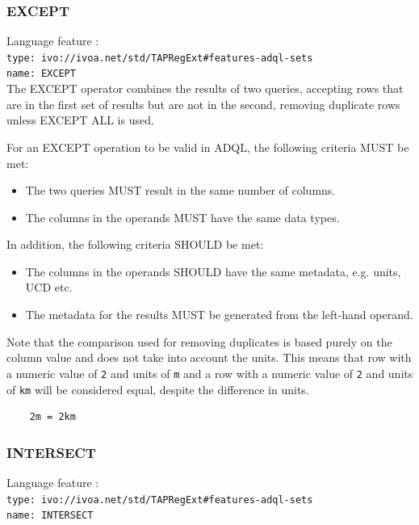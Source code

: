 \documentclass[11pt,a4paper]{ivoa}
\begin{document}
\subsubsection{EXCEPT}
{\footnotesize Language feature :}\\
{\footnotesize \verb|type: ivo://ivoa.net/std/TAPRegExt#features-adql-sets|}\\
{\footnotesize \verb|name: EXCEPT|}\\

The EXCEPT operator combines the results of two queries, accepting rows that are
in the first set of results but are not in the second,
removing duplicate rows unless EXCEPT ALL is used.

For an EXCEPT operation to be valid in ADQL, the following criteria MUST be met:

\begin{itemize}
    \item The two queries MUST result in the same number of columns.
    \item The columns in the operands MUST have the same data types.
\end{itemize}

In addition, the following criteria SHOULD be met: 
\begin{itemize}
    \item The columns in the operands SHOULD have the same metadata, e.g. units, UCD etc.
    \item The metadata for the results MUST be generated from the left-hand operand.
\end{itemize}

Note that the comparison used for removing duplicates is based purely on the
column value and does not take into account the units.
This means that row with a numeric value of \verb:2: and units of \verb:m:
and a row with a numeric value of \verb:2: and units of \verb:km: will be
considered equal, despite the difference in units.
\begin{verbatim}
    2m = 2km
\end{verbatim}

\subsubsection{INTERSECT}
{\footnotesize Language feature :}\\
{\footnotesize \verb|type: ivo://ivoa.net/std/TAPRegExt#features-adql-sets|}\\
{\footnotesize \verb|name: INTERSECT|}\\
\end{document}
